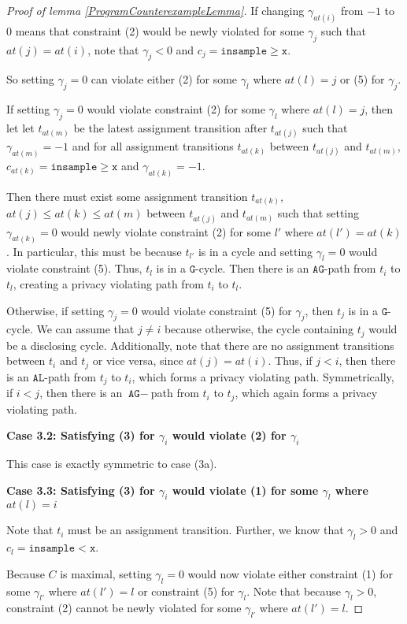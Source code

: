 \documentclass[12pt]{article}
\newcommand{\gguard}[1][x]{\texttt{insample}\geq#1}
\newcommand{\lguard}[1][x]{\texttt{insample} < #1}
\theoremstyle{definition}
\begin{document}
\begin{proof}[Proof of lemma \ref{ProgramCounterexampleLemma}]
    If changing $\gamma_{at(i)}$ from $-1$ to $0$ means that constraint (2) would be newly violated for some $\gamma_j$ such that $at(j) = at(i)$, note that $\gamma_j < 0$ and $c_j = \gguard[\texttt{x}]$. 
    
    So setting $\gamma_j = 0$ can violate either (2) for some $\gamma_l$ where $at(l) = j$ or (5) for $\gamma_j$. 

    If setting $\gamma_j = 0$ would violate constraint (2) for some $\gamma_l$ where $at(l) = j$, then let let $t_{at(m)}$ be the latest assignment transition after $t_{at(j)}$ such that $\gamma_{at(m)} = -1$ and for all assignment transitions $t_{at(k)}$ between $t_{at(j)}$ and $t_{at(m)}$, $c_{at(k)} = \gguard[\texttt{x}]$ and $\gamma_{at(k)} = -1$. 
    
    Then there must exist some assignment transition $t_{at(k)}$, $at(j)\leq at(k)\leq at(m)$ between $t_{at(j)}$ and $t_{at(m)}$ such that setting $\gamma_{at(k)} = 0$ would newly violate constraint (2) for some $l'$ where $at(l') = at(k)$. 
    In particular, this must be because $t_{l'}$ is in a cycle and setting $\gamma_l = 0$ would violate constraint (5). Thus, $t_l$ is in a $\texttt{G}$-cycle. Then there is an $\texttt{AG}$-path from $t_i$ to $t_l$, creating a privacy violating path from $t_i$ to $t_l$. 

    Otherwise, if setting $\gamma_j = 0$ would violate constraint (5) for $\gamma_j$, then $t_j$ is in a $\texttt{G}$-cycle. We can assume that $j\neq i$ because otherwise, the cycle containing $t_j$ would be a disclosing cycle. Additionally, note that there are no assignment transitions between $t_i$ and $t_j$ or vice versa, since $at(j) = at(i)$.
    Thus, if $j<i$, then there is an $\texttt{AL}$-path from $t_j$ to $t_i$, which forms a privacy violating path. Symmetrically, if $i<j$, then there is an $\texttt{AG}-$path from $t_i$ to $t_j$, which again forms a privacy violating path. 

    \textbf{Case 3.2: Satisfying (3) for $\gamma_i$ would violate (2) for $\gamma_i$}

    This case is exactly symmetric to case (3a).

    \textbf{Case 3.3: Satisfying (3) for $\gamma_i$ would violate (1) for some $\gamma_l$ where $at(l) = i$}

    Note that $t_i$ must be an assignment transition. Further, we know that $\gamma_l>0$ and $c_l = \lguard[\texttt{x}]$. 
    
    Because $C$ is maximal, setting $\gamma_l=0$ would now violate either constraint (1) for some $\gamma_{l'}$ where $at(l') = l$ or constraint (5) for $\gamma_l$. Note that because $\gamma_l>0$, constraint (2) cannot be newly violated for some $\gamma_{l'}$ where $at(l') = l$.


\end{proof}
\end{document}
